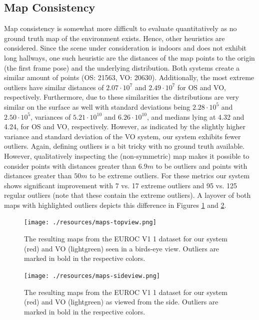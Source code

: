 \documentclass[a4paper, 10pt]{article}
\begin{document}
\subsection{Map Consistency}
\label{sec:org118633e}

Map consistency is somewhat more difficult to evaluate quantitatively as no ground truth map of the environment exists. 
Hence, other heuristics are considered. Since the scene under consideration is indoors and does not exhibit long hallways, one such heuristic are the distances of the map points 
to the origin (the first frame pose) and the underlying distribution. Both systems create a similar amount of points (OS: 21563, VO: 20630). 
Additionally, the most extreme outliers have similar distances of \(2.07 \cdot 10^7\) and \(2.49 \cdot 10^7\) for OS and VO, respectively. Furthermore, due to these similarities the distributions are very similar on the
surface as well with standard deviations being \(2.28 \cdot 10^5\) and \(2.50 \cdot 10^5\), variances of \(5.21 \cdot 10^{10}\) and \(6.26 \cdot 10^{10}\), and medians lying at 4.32 and 4.24, for OS and VO, respectively.
However, as indicated by the slightly higher variance and standard deviation of the VO system, our system exhibits fewer outliers. Again, defining outliers is a bit tricky with no ground truth available. However,
qualitatively inspecting the (non-symmetric) map makes it possible to consider points with distances greater than \(6.9m\) to be outliers and points with distances greater than \(50m\) to be extreme outliers. For these metrics
our system shows significant improvement with 7 vs. 17 extreme outliers and 95 vs. 125 regular outliers (note that these contain the extreme outliers).
A layover of both maps with highlighted outliers depicts this difference in Figures \ref{fig:orgde352a8} and \ref{fig:orgc1f3b2d}.
\begin{figure}[htbp]
\centering
\texttt{[image: ./resources/maps-topview.png]}
\caption{\label{fig:orgde352a8}
The resulting maps from the EUROC V1 1 dataset for our system (red) and VO (lightgreen) seen in a birds-eye view. Outliers are marked in bold in the respective colors.}
\end{figure}

\begin{figure}[htbp]
\centering
\texttt{[image: ./resources/maps-sideview.png]}
\caption{\label{fig:orgc1f3b2d}
The resulting maps from the EUROC V1 1 dataset for our system (red) and VO (lightgreen) as viewed from the side. Outliers are marked in bold in the respective colors.}
\end{figure}
\end{document}
